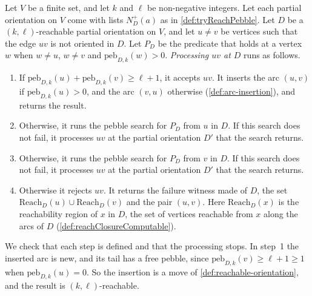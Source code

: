 \begin{definition}
  \label{def:tryAddEdge}
  \leanok
  Let $V$ be a finite set, and let $k$ and $\ell$ be non-negative
  integers. Let each partial orientation on $V$ come with lists
  $N^+_D(a)$ as in \cref{def:tryReachPebble}. Let $D$ be a
  $(k, \ell)$-reachable partial orientation on $V$, and let $u \ne v$
  be vertices such that the edge $uv$ is not oriented in $D$. Let $P_D$
  be the predicate that holds at a vertex $w$ when $w \ne u$, $w \ne v$
  and $\mathrm{peb}_{D, k}(w) > 0$. \emph{Processing $uv$ at $D$} runs
  as follows.
  \begin{enumerate}
    \item If $\mathrm{peb}_{D, k}(u) + \mathrm{peb}_{D, k}(v) \ge
      \ell + 1$, it accepts $uv$. It inserts the arc $(u, v)$ if
      $\mathrm{peb}_{D, k}(u) > 0$, and the arc $(v, u)$ otherwise
      (\cref{def:arc-insertion}), and returns the result.
    \item Otherwise, it runs the pebble search for $P_D$ from $u$ in
      $D$. If this search does not fail, it processes $uv$ at the
      partial orientation $D'$ that the search returns.
    \item Otherwise, it runs the pebble search for $P_D$ from $v$ in
      $D$. If this search does not fail, it processes $uv$ at the
      partial orientation $D'$ that the search returns.
    \item Otherwise it rejects $uv$. It returns the failure witness
      made of $D$, the set $\mathrm{Reach}_D(u) \cup \mathrm{Reach}_D(v)$
      and the pair $(u, v)$. Here $\mathrm{Reach}_D(x)$ is the
      reachability region of $x$ in $D$, the set of vertices reachable
      from $x$ along the arcs of $D$ (\cref{def:reachClosureComputable}).
  \end{enumerate}
\end{definition}

We check that each step is defined and that the processing stops. In
step~1 the inserted arc is new, and its tail has a free pebble, since
$\mathrm{peb}_{D, k}(v) \ge \ell + 1 \ge 1$ when
$\mathrm{peb}_{D, k}(u) = 0$. So the insertion is a move of
\cref{def:reachable-orientation}, and the result is
$(k, \ell)$-reachable.


